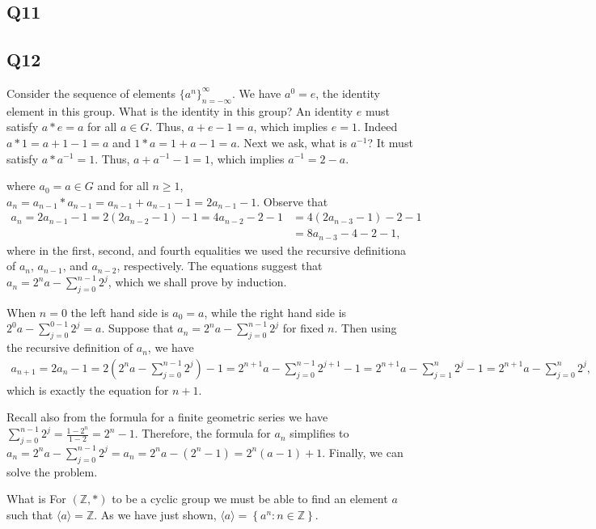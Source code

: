 \documentclass[12pt]{article}
\def\Z{{\mathbb Z}}        %
\numberwithin{theorem}{section}
\numberwithin{equation}{section}
\numberwithin{remark}{section}
\numberwithin{definition}{section}
\numberwithin{theorem}{section}
\numberwithin{lemma}{section}
\numberwithin{example}{section}
\begin{document}
\subsection{Q11}

\subsection{Q12}

Consider the sequence of elements $\{a^n\}_{n=-\infty}^\infty$. We have $a^0=e$, the identity element in this group. What is the identity in this group? An identity $e$ must satisfy $a*e=a$ for all $a\in G$. Thus, $a+e-1=a$, which implies $e=1$. Indeed $a*1=a+1-1=a$ and $1*a=1+a-1=a$. Next we ask, what is $a^{-1}$? It must satisfy $a*a^{-1}=1$. Thus, $a+a^{-1}-1=1$, which implies $a^{-1}=2-a$. 




where $a_0=a\in G$ and for all $n\ge1$, $a_{n}=a_{n-1}*a_{n-1}=a_{n-1}+a_{n-1}-1=2a_{n-1}-1$. Observe that
\begin{align*}
	a_n=2a_{n-1}-1=2\left(2a_{n-2}-1\right)-1=4a_{n-2}-2-1&=4\left(2a_{n-3}-1\right)-2-1\\
	&=8a_{n-3}-4-2-1,
\end{align*}
where in the first, second, and fourth equalities we used the recursive definitiona of $a_n$, $a_{n-1}$, and $a_{n-2}$, respectively. The equations suggest that $a_n=2^na-\sum_{j=0}^{n-1}2^j$, which we shall prove by induction. 

When $n=0$ the left hand side is $a_0=a$, while the right hand side is $2^0a-\sum_{j=0}^{0-1}2^j=a$. Suppose that $a_n=2^na-\sum_{j=0}^{n-1}2^j$ for fixed $n$. Then using the recursive definition of $a_n$, we have
\begin{align*}
	a_{n+1}=2a_{n}-1=2\left(2^na-\sum_{j=0}^{n-1}2^j\right)-1=2^{n+1}a-\sum_{j=0}^{n-1}2^{j+1}-1=2^{n+1}a-\sum_{j=1}^{n}2^{j}-1=2^{n+1}a-\sum_{j=0}^{n}2^{j},
\end{align*}
which is exactly the equation for $n+1$. 

Recall also from the formula for a finite geometric series we have $\sum_{j=0}^{n-1}2^j=\frac{1-2^n}{1-2}=2^n-1$. Therefore, the formula for $a_n$ simplifies to $a_n=2^na-\sum_{j=0}^{n-1}2^j=a_n=2^na-(2^n-1)=2^n(a-1)+1$. Finally, we can solve the problem. 

What is 
For $\left(\Z,*\right)$ to be a cyclic group we must be able to find an element $a$ such that $\langle a \rangle=\Z$. As we have just shown, $\langle a \rangle=\left\{a^n:n\in\Z\right\}$. 
\end{document}
